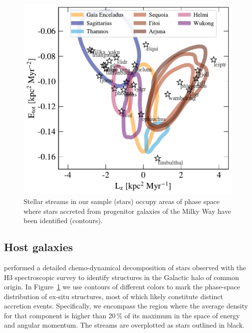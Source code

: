 \documentclass[twocolumn]{aastex63}
\begin{document}
\begin{figure}
\begin{center}
\includegraphics[width=\columnwidth]{stream_hosts.pdf}
\end{center}
\caption{
Stellar streams in our sample (stars) occupy areas of phase space where stars accreted from progenitor galaxies of the Milky Way have been identified (contours).
}
\label{fig:hosts}
\end{figure}

\subsection{Host galaxies}
\label{sec:hosts}
\citet{naidu2020} performed a detailed chemo-dynamical decomposition of stars observed with the H3 spectroscopic survey to identify structures in the Galactic halo of common origin.
In Figure~\ref{fig:hosts} we use contours of different colors to mark the phase-space distribution of ex-situ structures, most of which likely constitute distinct accretion events.
Specifically, we encompass the region where the average density for that component is higher than 20\,\% of its maximum in the space of energy and angular momentum.
The streams are overplotted as stars outlined in black.
\end{document}
